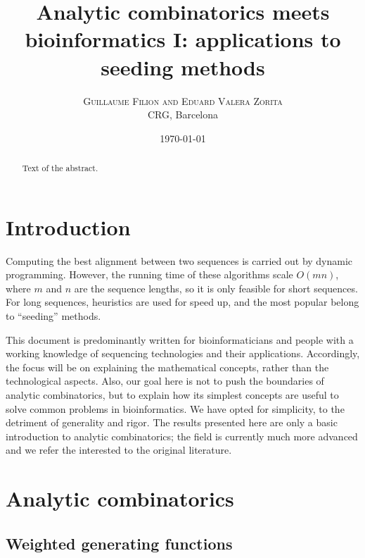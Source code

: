 \documentclass{article}
\title{Analytic combinatorics meets bioinformatics I: applications to
seeding methods}
\author{
\textsc{Guillaume Filion and Eduard Valera Zorita} \\ [1ex]
\normalsize CRG, Barcelona
}
\date{\today}
\begin{document}
\maketitle

\begin{abstract}
Text of the abstract.
\end{abstract}



\section{Introduction}

Computing the best alignment between two sequences is carried out by
dynamic programming. However, the running time of these algorithms scale
$O(mn)$, where $m$ and $n$ are the sequence lengths, so it is only
feasible for short sequences. For long sequences, heuristics are used for
speed up, and the most popular belong to ``seeding'' methods.

This document is predominantly written for bioinformaticians and people
with a working knowledge of sequencing technologies and their applications.
Accordingly, the focus will be on explaining the mathematical concepts,
rather than the technological aspects. Also, our goal here is not to push
the boundaries of analytic combinatorics, but to explain how its simplest
concepts are useful to solve common problems in bioinformatics. We have
opted for simplicity, to the detriment of generality and rigor. The
results presented here are only a basic introduction to analytic
combinatorics; the field is currently much more advanced and we refer the
interested to the original literature.

\section{Analytic combinatorics}
\subsection{Weighted generating functions}
\label{subsec:WGF}
\end{document}
